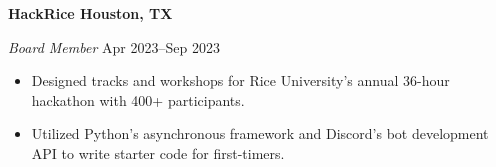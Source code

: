\textbf{HackRice \hfill Houston, TX}\par
\textit{Board Member} \hfill Apr 2023--Sep 2023

\begin{itemize}
	\item Designed tracks and workshops for Rice University's annual 36-hour hackathon with 400+ participants.
	\item Utilized Python's asynchronous framework and Discord's bot development API to write starter code for first-timers.
\end{itemize}\par